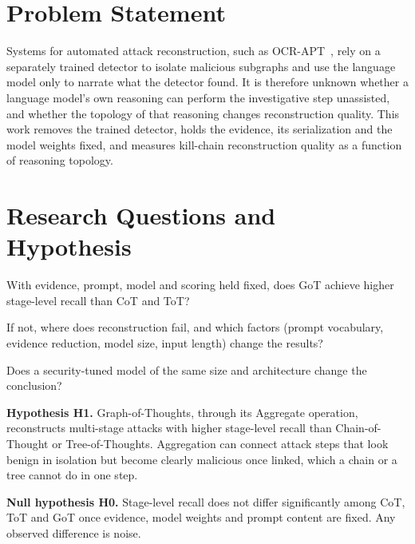 \section{Problem Statement}
Systems for automated attack reconstruction, such as OCR-APT~\cite{aly2025ocrapt}, rely on a separately trained detector to isolate malicious subgraphs and use the language model only to narrate what the detector found. It is therefore unknown whether a language model's own reasoning can perform the investigative step unassisted, and whether the topology of that reasoning changes reconstruction quality. This work removes the trained detector, holds the evidence, its serialization and the model weights fixed, and measures kill-chain reconstruction quality as a function of reasoning topology.

\section{Research Questions and Hypothesis}
\begin{description}[leftmargin=2.6em,style=nextline]
\item[RQ1] With evidence, prompt, model and scoring held fixed, does GoT achieve higher stage-level recall than CoT and ToT?
\item[RQ2] If not, where does reconstruction fail, and which factors (prompt vocabulary, evidence reduction, model size, input length) change the results?
\item[RQ3] Does a security-tuned model of the same size and architecture change the conclusion?
\end{description}

\textbf{Hypothesis H1.} Graph-of-Thoughts, through its Aggregate operation, reconstructs multi-stage attacks with higher stage-level recall than Chain-of-Thought or Tree-of-Thoughts. Aggregation can connect attack steps that look benign in isolation but become clearly malicious once linked, which a chain or a tree cannot do in one step.

\textbf{Null hypothesis H0.} Stage-level recall does not differ significantly among CoT, ToT and GoT once evidence, model weights and prompt content are fixed. Any observed difference is noise.

